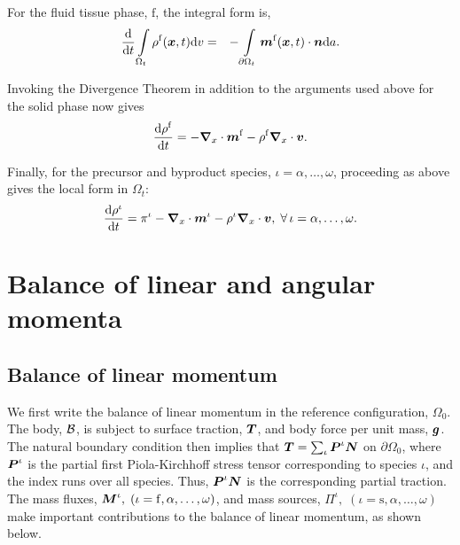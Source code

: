 For the fluid tissue phase, $\mathrm{f}$, the integral form is,
\begin{eqnarray}
\frac{\mathrm{d}}{\mathrm{d}t}
\int\limits_{\Omega_t}\rho^\mathrm{f}(\mbox{\boldmath$ x$},t)\mathrm{d}v & = & -
\int\limits_{\partial\Omega_t}\mbox{\boldmath$ m$}^\mathrm{f}(\mbox{\boldmath$ x$},t)\cdot\mbox{\boldmath$ n$}\mathrm{d}a.
\label{massbalcurr1B}
\end{eqnarray}

\noindent Invoking the Divergence Theorem in addition to the
arguments used above for the solid phase now gives
\begin{equation}
\frac{\mathrm{d}\rho^\mathrm{f}}{\mathrm{d}t} = -
\mbox{\boldmath$\nabla$}_x\cdot\mbox{\boldmath$ m$}^\mathrm{f} - \rho^\mathrm{f} \mbox{\boldmath$\nabla$}_x\cdot\mbox{\boldmath$ v$}.
\label{massbalcurr2B}
\end{equation}

Finally, for the precursor and byproduct species, $\iota =
\alpha,\dots,\omega$, proceeding as above gives the local form in
$\Omega_t$:
\begin{equation}
\frac{\mathrm{d}\rho^\iota}{\mathrm{d}t} = \pi^\iota-
\mbox{\boldmath$\nabla$}_x\cdot\mbox{\boldmath$ m$}^\iota - \rho^\iota
\mbox{\boldmath$\nabla$}_x\cdot\mbox{\boldmath$ v$},\;\forall\,\iota = \alpha,\dots,\omega.
\label{massbalcurr2I}
\end{equation}

\section{Balance of linear and angular momenta}
\label{sect3}

\subsection{Balance of linear momentum}
\label{sect3.1} We first write the balance of linear momentum in
the reference configuration, $\Omega_0$. The body, ${\mathcal B}$, is
subject to surface traction, $\mbox{\boldmath$ T$}$, and body force per unit mass,
$\mbox{\boldmath$ g$}$. The natural boundary condition then implies that $\mbox{\boldmath$ T$} =
\sum_{\iota}\mbox{\boldmath$ P$}^\iota\mbox{\boldmath$ N$}$ on $\partial\Omega_0$, where $\mbox{\boldmath$ P$}^\iota$
is the partial first Piola-Kirchhoff stress tensor corresponding
to species $\iota$, and the index runs over all species. Thus,
$\mbox{\boldmath$ P$}^\iota\mbox{\boldmath$ N$}$ is the corresponding partial traction. The mass
fluxes, $\mbox{\boldmath$ M$}^\iota,\;(\iota = \mathrm{f},\alpha,\dots,\omega)$,
and mass sources, $\Pi^\iota,\;(\iota =
\mathrm{s},\alpha,\dots,\omega)$ make important contributions to
the balance of linear momentum, as shown below.

